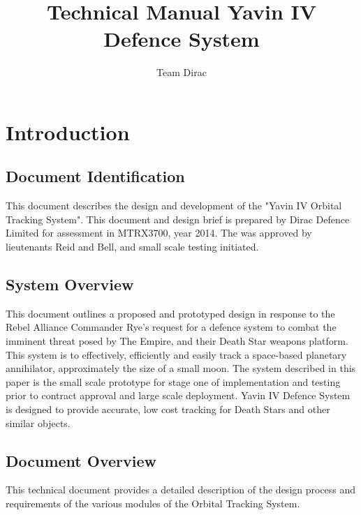 \documentclass[]{report}
\title{Technical Manual \newline Yavin IV Defence System}
\author{Team Dirac}
\begin{document}
\maketitle

\chapter{Introduction}
\section{Document Identification}
This document describes the design and development of the "Yavin IV Orbital Tracking System".  This document and design brief is prepared by Dirac Defence Limited for assessment in MTRX3700, year 2014. The was approved by lieutenants Reid and Bell, and small scale testing initiated. 

\section{System Overview}

This document outlines a proposed and prototyped design in response to the Rebel Alliance Commander Rye's request for a defence system to combat the imminent threat posed by The Empire, and their Death Star weapons platform. This system is to effectively, efficiently and easily track a space-based planetary annihilator, approximately the size of a small moon.\newline
The system described in this paper is the small scale prototype for stage one of implementation and testing prior to contract approval and large scale deployment. Yavin IV Defence System is designed to provide accurate, low cost tracking for Death Stars and other similar objects.

\section{Document Overview}

This technical document provides a detailed description of the design process and requirements of the various modules of the Orbital Tracking System. \newline
\end{document}
